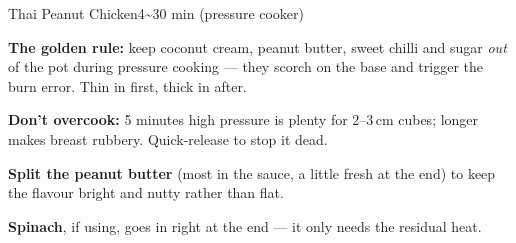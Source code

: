 \begin{recipebox}{Thai Peanut Chicken}{4}{\textasciitilde30 min (pressure cooker)}
\begin{notelist}
  \item \textbf{The golden rule:} keep coconut cream, peanut butter, sweet chilli
        and sugar \emph{out} of the pot during pressure cooking --- they scorch
        on the base and trigger the burn error. Thin in first, thick in after.
  \item \textbf{Don't overcook:} 5 minutes high pressure is plenty for 2--3\,cm
        cubes; longer makes breast rubbery. Quick-release to stop it dead.
  \item \textbf{Split the peanut butter} (most in the sauce, a little fresh at
        the end) to keep the flavour bright and nutty rather than flat.
  \item \textbf{Spinach}, if using, goes in right at the end --- it only needs
        the residual heat.
\end{notelist}

\end{recipebox}